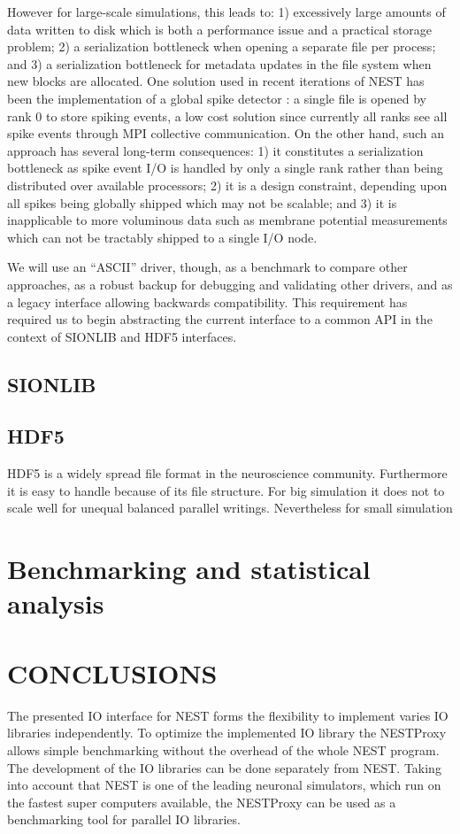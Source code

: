 \documentclass[]{YIC2015}
\begin{document}
However for large-scale simulations, this leads to: 1) excessively
large amounts of data written to disk which is both a performance
issue and a practical storage problem; 2) a serialization bottleneck
when opening a separate file per process; and 3) a serialization
bottleneck for metadata updates in the file system when new blocks are
allocated. One solution used in recent iterations of NEST has been the
implementation of a global spike detector \cite{gsd}: a single file is
opened by rank 0 to store spiking events, a low cost solution since
currently all ranks see all spike events through MPI collective
communication. On the other hand, such an approach has several
long-term consequences: 1) it constitutes a serialization bottleneck
as spike event I/O is handled by only a single rank rather than being
distributed over available processors; 2) it is a design constraint,
depending upon all spikes being globally shipped which may not be
scalable; and 3) it is inapplicable to more voluminous data such as
membrane potential measurements which can not be tractably shipped to
a single I/O node.

We will use an ``ASCII'' driver, though, as a benchmark to compare
other approaches, as a robust backup for debugging and validating
other drivers, and as a legacy interface allowing backwards
compatibility. This requirement has required us to begin abstracting
the current interface to a common API in the context of SIONLIB and
HDF5 interfaces.

\subsection{SIONLIB}
\subsection{HDF5}
HDF5 is a widely spread file format in the neuroscience community.
Furthermore it is easy to handle because of its file structure.
For big simulation it does not to scale well for unequal balanced parallel writings.
Nevertheless for small simulation 
\section{Benchmarking and statistical analysis}


\section{CONCLUSIONS}
The presented IO interface for NEST forms the flexibility to implement varies IO libraries independently.
To optimize the implemented IO library the NESTProxy allows simple benchmarking without the overhead of the whole NEST program.
The development of the IO libraries can be done separately from NEST.
Taking into account that NEST is one of the leading neuronal simulators, which run on the fastest super computers available,
the NESTProxy can be used as a benchmarking tool for parallel IO libraries.
\end{document}
